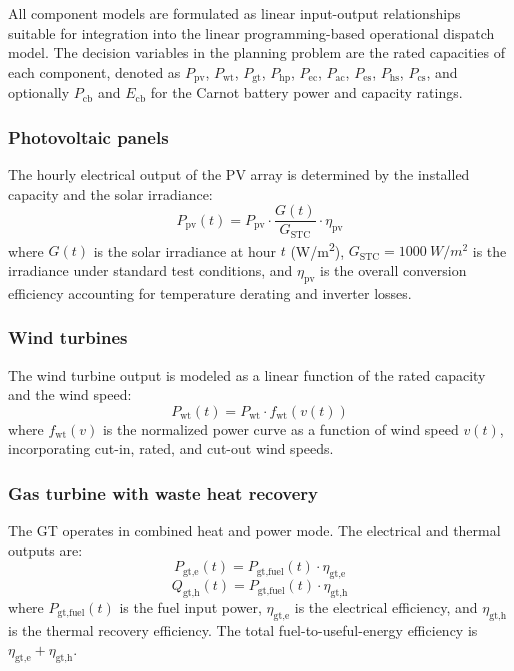All component models are formulated as linear input-output relationships suitable for integration into the linear programming-based operational dispatch model. The decision variables in the planning problem are the rated capacities of each component, denoted as $P_{\text{pv}}$, $P_{\text{wt}}$, $P_{\text{gt}}$, $P_{\text{hp}}$, $P_{\text{ec}}$, $P_{\text{ac}}$, $P_{\text{es}}$, $P_{\text{hs}}$, $P_{\text{cs}}$, and optionally $P_{\text{cb}}$ and $E_{\text{cb}}$ for the Carnot battery power and capacity ratings.

\subsubsection{Photovoltaic panels}

The hourly electrical output of the PV array is determined by the installed capacity and the solar irradiance:
\begin{equation}
    P_{\text{pv}}(t) = P_{\text{pv}} \cdot \frac{G(t)}{G_{\text{STC}}} \cdot \eta_{\text{pv}}
    \label{eq:pv}
\end{equation}
where $G(t)$ is the solar irradiance at hour $t$ (\si{W/m^2}), $G_{\text{STC}} = \SI{1000}{W/m^2}$ is the irradiance under standard test conditions, and $\eta_{\text{pv}}$ is the overall conversion efficiency accounting for temperature derating and inverter losses.

\subsubsection{Wind turbines}

The wind turbine output is modeled as a linear function of the rated capacity and the wind speed:
\begin{equation}
    P_{\text{wt}}(t) = P_{\text{wt}} \cdot f_{\text{wt}}(v(t))
    \label{eq:wt}
\end{equation}
where $f_{\text{wt}}(v)$ is the normalized power curve as a function of wind speed $v(t)$, incorporating cut-in, rated, and cut-out wind speeds.

\subsubsection{Gas turbine with waste heat recovery}

The GT operates in combined heat and power mode. The electrical and thermal outputs are:
\begin{equation}
    P_{\text{gt,e}}(t) = P_{\text{gt,fuel}}(t) \cdot \eta_{\text{gt,e}}
    \label{eq:gt_e}
\end{equation}
\begin{equation}
    Q_{\text{gt,h}}(t) = P_{\text{gt,fuel}}(t) \cdot \eta_{\text{gt,h}}
    \label{eq:gt_h}
\end{equation}
where $P_{\text{gt,fuel}}(t)$ is the fuel input power, $\eta_{\text{gt,e}}$ is the electrical efficiency, and $\eta_{\text{gt,h}}$ is the thermal recovery efficiency. The total fuel-to-useful-energy efficiency is $\eta_{\text{gt,e}} + \eta_{\text{gt,h}}$.

